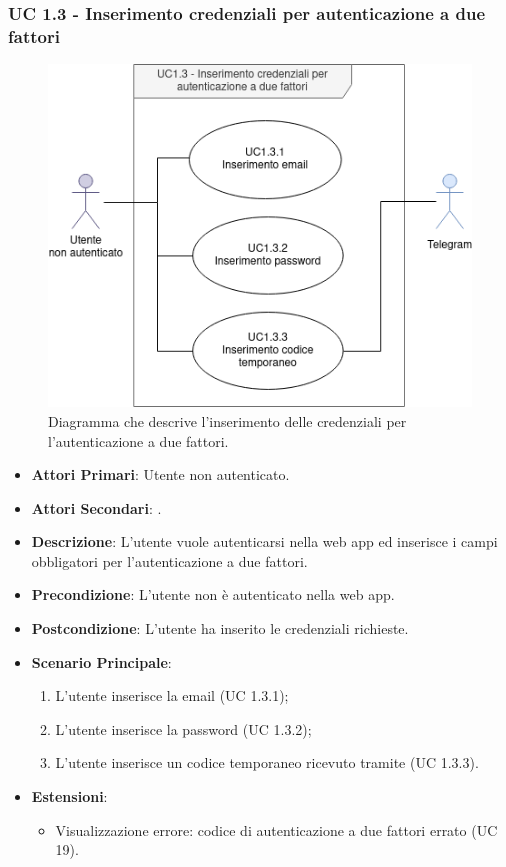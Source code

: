 		\subsubsection{UC 1.3 - Inserimento credenziali per autenticazione a due fattori}

		\begin{figure}[H]
			\centering
			\includegraphics[scale=0.675]{res/images/uc1.3}
			\caption{Diagramma che descrive l'inserimento delle credenziali per l'autenticazione a due fattori.}
		\end{figure}

		\begin{itemize}
			\item \textbf{Attori Primari}: Utente non autenticato.
			\item \textbf{Attori Secondari}: .
			\item \textbf{Descrizione}: L'utente vuole autenticarsi nella web app ed inserisce i campi obbligatori per l'autenticazione a due fattori.
			\item \textbf{Precondizione}: L'utente non è autenticato nella web app.
			\item \textbf{Postcondizione}: L'utente ha inserito le credenziali richieste.
			\item \textbf{Scenario Principale}:
				\begin{enumerate}
					\item L'utente inserisce la email (UC 1.3.1);
					\item L'utente inserisce la password (UC 1.3.2);
					\item L'utente inserisce un codice temporaneo ricevuto tramite  (UC 1.3.3).
				\end{enumerate}
			\item \textbf{Estensioni}:
				\begin{itemize}
					\item Visualizzazione errore: codice di autenticazione a due fattori errato (UC 19).
				\end{itemize}	
		\end{itemize}

